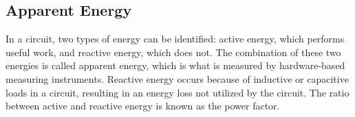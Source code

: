 \subsection{Apparent Energy}

In a circuit, two types of energy can be identified: active energy, which performs useful work, and reactive energy, which does not. The combination of these two energies is called apparent energy, which is what is measured by hardware-based measuring instruments. Reactive energy occurs because of inductive or capacitive loads in a circuit, resulting in an energy loss not utilized by the circuit\cite{ReactP}. The ratio between active and reactive energy is known as the power factor\cite{ReactP}.